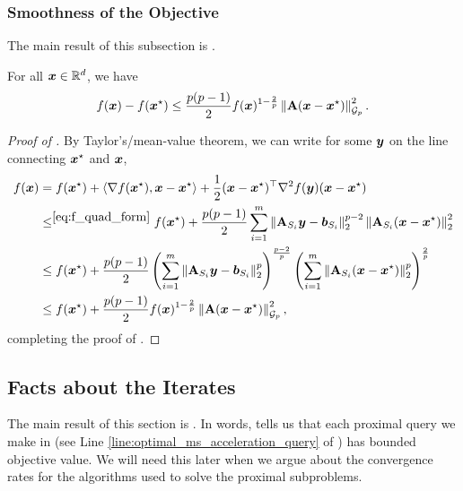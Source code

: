 \subsubsection{Smoothness of the Objective}

The main result of this subsection is .

\begin{lemma}
\label{lemma:gp_smooth}
For all $\bm{x}\in\mathbb{R}^d$, we have
\begin{align*}
    f(\bm{x})-f(\bm{x}^{\star}) \le \frac{p(p-1)}{2}f(\bm{x})^{1-\frac{2}{p}}\left\lVert \mathbf{A}(\bm{x}-\bm{x}^{\star}) \right\rVert_{\mathcal{G}_{p}}^2.
\end{align*}
\end{lemma}
\begin{proof}[Proof of ]
By Taylor's/mean-value theorem, we can write for some $\bm{y}$ on the line connecting $\bm{x}^{\star}$ and $\bm{x}$,
\begin{align*}
    f(\bm{x}) &= f(\bm{x}^{\star}) + \left\langle \nabla f(\bm{x}^{\star}), \bm{x}-\bm{x}^{\star} \right\rangle + \frac{1}{2}(\bm{x}-\bm{x}^{\star})^{\top}\nabla^2 f(\bm{y})(\bm{x}-\bm{x}^{\star}) \\
    &\le^{\eqref{eq:f_quad_form}} f(\bm{x}^{\star}) + \frac{p(p-1)}{2}\sum_{i=1}^m \left\lVert \mathbf{A}_{S_i}\bm{y}-\bm{b}_{S_i} \right\rVert_2^{p-2}\left\lVert \mathbf{A}_{S_i}(\bm{x}-\bm{x}^{\star}) \right\rVert_2^2 \\
    &\le f(\bm{x}^{\star}) + \frac{p(p-1)}{2} \left(\sum_{i=1}^m \left\lVert \mathbf{A}_{S_i}\bm{y}-\bm{b}_{S_i} \right\rVert_2^{p}\right)^{\frac{p-2}{p}}\left(\sum_{i=1}^m \left\lVert \mathbf{A}_{S_i}(\bm{x}-\bm{x}^{\star}) \right\rVert_2^p\right)^{\frac{2}{p}} \\
    &\le f(\bm{x}^{\star}) + \frac{p(p-1)}{2}f(\bm{x})^{1-\frac{2}{p}}\left\lVert \mathbf{A}(\bm{x}-\bm{x}^{\star}) \right\rVert_{\mathcal{G}_{p}}^2,
\end{align*}
completing the proof of .
\end{proof}

\subsection{Facts about the Iterates}
\label{sec:gp_iterate_facts}

The main result of this section is . In words,  tells us that each proximal query we make in  (see Line \ref{line:optimal_ms_acceleration_query} of ) has bounded objective value. We will need this later when we argue about the convergence rates for the algorithms used to solve the proximal subproblems.


